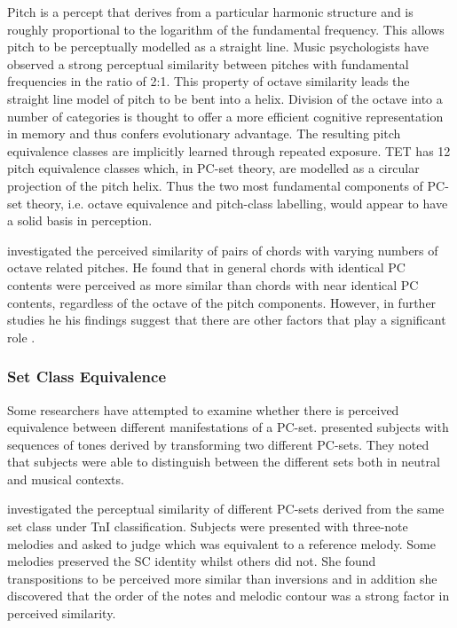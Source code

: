 \documentclass{article}
\begin{document}
Pitch is a percept that derives from a particular harmonic structure
and is roughly proportional to the logarithm of the fundamental
frequency. This allows pitch to be perceptually modelled as a straight
line. Music psychologists have observed a strong perceptual similarity
between pitches with fundamental frequencies in the ratio of 2:1. This
property of octave similarity leads the straight line model of pitch
to be bent into a helix. Division of the octave into a number of
categories is thought to offer a more efficient cognitive
representation in memory and thus confers evolutionary advantage. The
resulting pitch equivalence classes are implicitly learned through
repeated exposure. TET has 12 pitch equivalence classes which, in
PC-set theory, are modelled as a circular projection of the pitch
helix. Thus the two most fundamental components of PC-set theory,
i.e. octave equivalence and pitch-class labelling, would appear to
have a solid basis in perception.

\citet{Gibson1988} investigated the perceived similarity of pairs of
chords with varying numbers of octave related pitches. He found that
in general chords with identical PC contents were perceived as more
similar than chords with near identical PC contents, regardless of the
octave of the pitch components. However, in further studies he his
findings suggest that there are other factors that play a significant
role \citep{Gibson1993}.
\subsubsection{Set Class Equivalence}
\label{sec-3-5-2}

Some researchers have attempted to examine whether there is perceived
equivalence between different manifestations of a
PC-set. \citet{KrumhanslSandell1987} presented subjects with sequences
of tones derived by transforming two different PC-sets. They noted
that subjects were able to distinguish between the different sets both
in neutral and musical contexts.  

\citet{Millar1984} investigated the perceptual similarity of different
PC-sets derived from the same set class under TnI
classification. Subjects were presented with three-note melodies and
asked to judge which was equivalent to a reference melody. Some
melodies preserved the SC identity whilst others did not. She found
transpositions to be perceived more similar than inversions and in
addition she discovered that the order of the notes and melodic
contour was a strong factor in perceived similarity.
\end{document}
